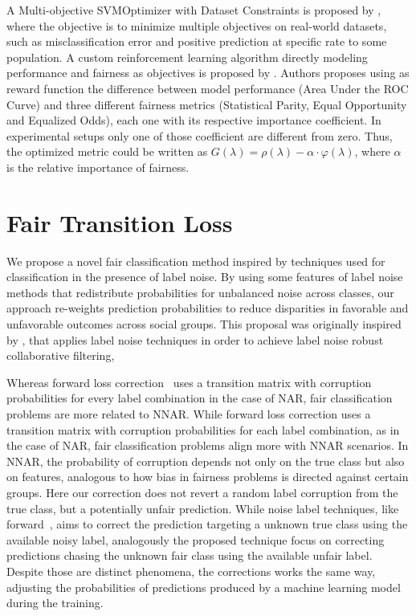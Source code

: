 A Multi-objective SVMOptimizer with Dataset Constraints is proposed by \cite{Goh2016}, where the objective is to minimize multiple objectives on real-world datasets, such as misclassification error and positive prediction at specific rate to some population. A custom reinforcement learning algorithm directly modeling performance and fairness as objectives is proposed by \cite{Petrovic2021}. Authors proposes using as reward function the difference between model performance (Area Under the ROC Curve) and three different fairness metrics (Statistical Parity, Equal Opportunity and Equalized Odds), each one with its respective importance coefficient. In experimental setups only one of those coefficient are different from zero. Thus, the optimized metric could be written as $G(\lambda) = \rho(\lambda) - \alpha \cdot \varphi(\lambda)$, where $\alpha$ is the relative importance of fairness.

\section{Fair Transition Loss} \label{sec:ftl_proposal}

We propose a novel fair classification method inspired by techniques used for classification in the presence of label noise. By using some features of label noise methods that redistribute probabilities for unbalanced noise across classes, our approach re-weights prediction probabilities to reduce disparities in favorable and unfavorable outcomes across social groups. This proposal was originally inspired by \cite{Braida2018}, that applies label noise techniques in order to achieve label noise robust collaborative filtering,

Whereas forward loss correction~\citep{Patrini2017} uses a transition matrix with corruption probabilities for every label combination in the case of NAR, fair classification problems are more related to NNAR. While forward loss correction uses a transition matrix with corruption probabilities for each label combination, as in the case of NAR, fair classification problems align more with NNAR scenarios. In NNAR, the probability of corruption depends not only on the true class but also on features, analogous to how bias in fairness problems is directed against certain groups. Here our correction does not revert a random label corruption from the true class, but a potentially unfair prediction. While noise label techniques, like forward~\citep{Patrini2017}, aims to correct the prediction targeting a unknown true class using the available noisy label, analogously the proposed technique focus on correcting predictions chasing the unknown fair class using the available unfair label. Despite those are distinct phenomena, the corrections works the same way, adjusting the probabilities of predictions produced by a machine learning model during the training. 

